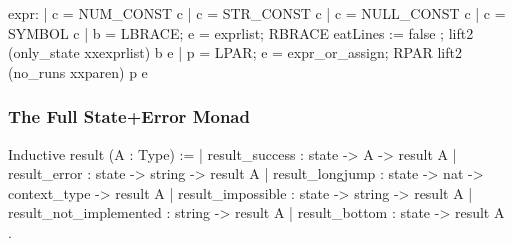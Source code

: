 \documentclass{beamer}
\begin{document}
\frame{\questiontoc}

\begin{frame}[fragile]
    \label{frame:parser}

\begin{camlcode}
expr:
  | c = NUM_CONST                       { c }
  | c = STR_CONST                       { c }
  | c = NULL_CONST                      { c }
  | c = SYMBOL                          { c }
  | b = LBRACE; e = exprlist; RBRACE
    { eatLines := false ; lift2 (only_state xxexprlist) b e }
  | p = LPAR; e = expr_or_assign; RPAR
    { lift2 (no_runs xxparen) p e }
\end{camlcode}


\end{frame}

\frame{\questiontoc}

\begin{frame}[fragile]
    \label{frame:full:monad}
    \frametitle{The Full State+Error Monad}

\begin{coqcode}
Inductive result (A : Type) :=
  | result_success : state -> A -> result A
  | result_error : state -> string -> result A
  | result_longjump : state -> nat -> context_type -> result A
  | result_impossible : state -> string -> result A
  | result_not_implemented : string -> result A
  | result_bottom : state -> result A
  .
\end{coqcode}

\end{frame}

\frame{\questiontoc}

\frame{\tableofcontents}
\end{document}
